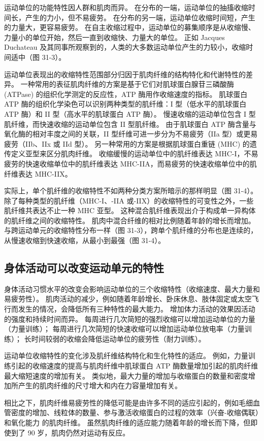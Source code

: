 运动单位的功能特性因人群和肌肉而异。 在分布的一端，运动单位的抽搐收缩时间长，产生的力小，但不易疲劳。 在分布的另一端，运动单位收缩时间短，产生的力量大，更容易疲劳。 在自主收缩过程中，运动单位的募集顺序是从收缩慢、力量小的单位开始，然后一直到收缩快、力量大的单位。 正如 Jacques Duchateau 及其同事所观察到的，人类的大多数运动单位产生的力较小，收缩时间适中（图 31-3）。

运动单位表现出的收缩特性范围部分归因于肌肉纤维的结构特化和代谢特性的差异。 一种常用的表征肌肉纤维的方案是基于它们对肌球蛋白腺苷三磷酸酶 (ATPase) 的组织化学测定的反应性，ATP 酶用作收缩速度的指标。 肌球蛋白 ATP 酶的组织化学染色可以识别两种类型的肌纤维：I 型（低水平的肌球蛋白 ATP 酶）和 II 型（高水平的肌球蛋白 ATP 酶）。 慢速收缩的运动单位包含 I 型肌纤维，而快速收缩的运动单位包含 II 型肌纤维。 由于肌球蛋白 ATP 酶含量与氧化酶的相对丰度之间的关联，II 型纤维可进一步分为不易疲劳（IIa 型）或更易疲劳（IIb、IIx 或 IId 型）。 另一种常用的方案是根据肌球蛋白重链 (MHC) 的遗传定义亚型来区分肌肉纤维。 收缩缓慢的运动单位中的肌纤维表达 MHC-I，不易疲劳的快速收缩单位中的肌纤维表达 MHC-IIA，而易疲劳的快速收缩单位中的肌纤维表达 MHC-IIX。

实际上，单个肌纤维的收缩特性不如两种分类方案所暗示的那样明显（图 31-4）。 除了每种类型的肌纤维（MHC-I、-IIA 或-IIX）的收缩特性的可变性之外，一些肌纤维共表达不止一种 MHC 亚型。 这种混合肌纤维表现出介于构成单一异构体的肌纤维之间的收缩特性。 肌肉中混合纤维的相对比例随着年龄的增长而增加。 与跨运动单元的收缩特性分布一样（图 31-3），跨单个肌纤维的分布也是连续的，从慢速收缩到快速收缩，从最小到最强（图 31-4）。

\subsection{身体活动可以改变运动单元的特性}
身体活动习惯水平的改变会影响运动单位的三个收缩特性（收缩速度、最大力量和易疲劳性）。 肌肉活动的减少，例如随着年龄增长、卧床休息、肢体固定或太空飞行而发生的情况，会降低所有三种特性的最大能力。 增加体力活动的效果因活动的强度和持续时间而异。 每周进行几次简短的强烈收缩可以增加运动单位的力量（力量训练）； 每周进行几次简短的快速收缩可以增加运动单位放电率（力量训练）； 长时间较弱的收缩会降低运动单位的疲劳性（耐力训练）。

运动单位收缩特性的变化涉及肌纤维结构特化和生化特性的适应。 例如，力量训练引起的收缩速度的提高与肌肉纤维中肌球蛋白 ATP 酶数量增加引起的肌肉纤维最大缩短速度的增加有关。 类似地，最大力量的增加与收缩蛋白的数量和密度增加所产生的肌肉纤维的尺寸增大和内在力容量增加有关。

相比之下，肌肉纤维易疲劳性的降低可能是由许多不同的适应引起的，例如毛细血管密度的增加、线粒体的数量、参与激活收缩蛋白的过程的效率（兴奋-收缩偶联）和氧化能力 的肌肉纤维。 虽然肌肉纤维的适应能力随着年龄的增长而下降，但即使到了 90 岁，肌肉仍然对运动有反应。

